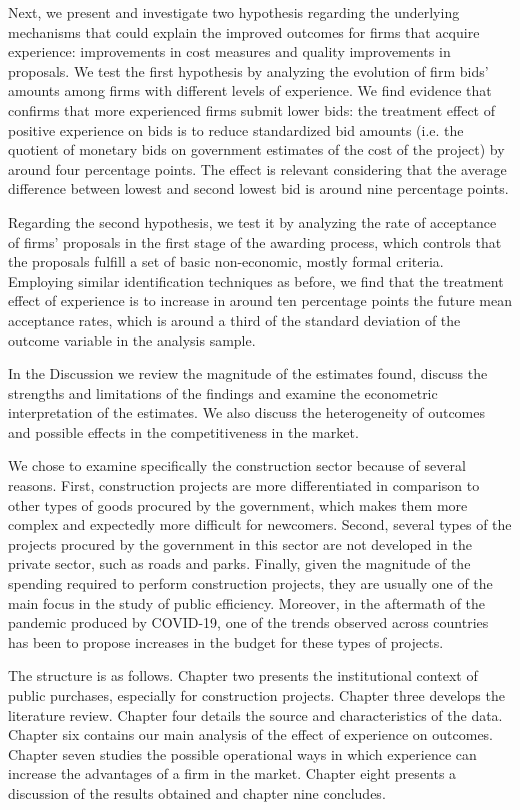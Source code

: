  Next, we present and investigate two hypothesis regarding the underlying mechanisms that could explain the improved outcomes for firms that acquire experience: improvements in cost measures and quality improvements in proposals. We test the first hypothesis by analyzing the evolution of firm bids' amounts among firms with different levels of experience. We find evidence that confirms that more experienced firms submit lower bids: the treatment effect of positive experience on bids is to reduce standardized bid amounts (i.e. the quotient of monetary bids on government estimates of the cost of the project) by around four percentage points. The effect is relevant considering that the average difference between lowest and second lowest bid is around nine percentage points.

Regarding the second hypothesis, we test it by analyzing the rate of acceptance of firms' proposals in the first stage of the awarding process, which controls that the proposals fulfill a set of basic non-economic, mostly formal criteria.  Employing similar identification techniques as before, we find that the treatment effect of experience is to increase in around ten percentage points the future mean acceptance rates, which is around a third of the standard deviation of the outcome variable in the analysis sample.

In the Discussion we review the magnitude of the estimates found, discuss the strengths and limitations of the findings and examine the econometric interpretation of the estimates. We also discuss the heterogeneity of outcomes and possible effects in the competitiveness in the market.

We chose to examine specifically the construction sector because of several reasons. First, construction projects are more differentiated in comparison to other types of goods procured by the government, which makes them more complex and expectedly more difficult for newcomers. Second, several types of the projects procured by the government in this sector are not developed in the private sector, such as roads and parks. Finally, given the magnitude of the spending required to perform construction projects, they are usually one of the main focus in the study of public efficiency. Moreover, in the aftermath of the pandemic produced by COVID-19, one of the trends observed across countries has been to propose increases in the budget for these types of projects.

The structure is as follows. Chapter two presents the institutional context of public purchases, especially for construction projects. Chapter three develops the literature review. Chapter four details the source and characteristics of the data. Chapter six contains our main analysis of the effect of experience on outcomes. Chapter seven studies the possible operational ways in which experience can increase the advantages of a firm in the market. Chapter eight presents a discussion of the results obtained and chapter nine concludes.
